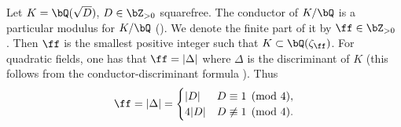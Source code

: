 \begin{rem}\label{conductor}
    Let $K = \bQ(\sqrt{D})$, $D \in \bZ_{>0}$ squarefree. The conductor of $K / \bQ$ is a particular modulus for $K / \bQ$ (\cite[Ch VI, Definition 6.4]{Neukirch}). We denote the finite part of it by $\ff \in \bZ_{>0}$ . Then $\ff$ is the smallest positive integer such that $K \subset \bQ(\zeta_{\ff})$. For quadratic fields, one has that $\ff = |\Delta|$ where $\Delta$ is the discriminant of $K$ (this follows from the conductor-discriminant formula \cite[Ch VII, (11.9)]{Neukirch}). Thus
\[ \ff = |\Delta| =  \begin{cases} |D| & D \equiv 1 \pmod 4, \\ 4|D| & D \not\equiv 1 \pmod 4. \end{cases} \]
\end{rem}
